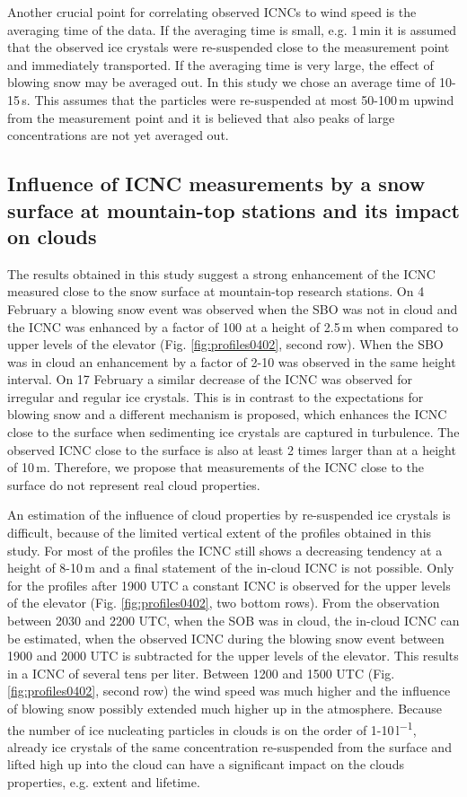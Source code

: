 \documentclass[draft,linenumbers]{agujournal}
\begin{document}
Another crucial point for correlating observed ICNCs to wind speed is the averaging time of the data. If the averaging time is small, e.g. 1\,\si{min} it is assumed that the observed ice crystals were re-suspended close to the measurement point and immediately transported. If the averaging time is very large, the effect of blowing snow may be averaged out. In this study we chose an average time of 10-15\,\si{s}. This assumes that the particles were re-suspended at most 50-100\,\si{m} upwind from the measurement point and it is believed that also peaks of large concentrations are not yet averaged out. 


\subsection{Influence of ICNC measurements by a snow surface at mountain-top stations and its impact on clouds}

The results obtained in this study suggest a strong enhancement of the ICNC measured close to the snow surface at mountain-top research stations. On 4 February a blowing snow event was observed when the SBO was not in cloud and the ICNC was enhanced by a factor of 100 at a height of 2.5\,\si{m} when compared to upper levels of the elevator (Fig. \ref{fig:profiles0402}, second row). When the SBO was in cloud an enhancement by a factor of 2-10 was observed in the same height interval. On 17 February a similar decrease of the ICNC was observed for irregular and regular ice crystals. This is in contrast to the expectations for blowing snow and a different mechanism is proposed, which enhances the ICNC close to the surface when sedimenting ice crystals are captured in turbulence. The observed ICNC close to the surface is also at least 2 times larger than at a height of 10\,\si{m}. Therefore, we propose that measurements of the ICNC close to the surface do not represent real cloud properties. 

An estimation of the influence of cloud properties by re-suspended ice crystals is difficult, because of the limited vertical extent of the profiles obtained in this study. For most of the profiles the ICNC still shows a decreasing tendency at a height of 8-10\,\si{m} and a final statement of the in-cloud ICNC is not possible. Only for the profiles after 1900 UTC a constant ICNC is observed for the upper levels of the elevator (Fig. \ref{fig:profiles0402}, two bottom rows). From the observation between  2030 and 2200 UTC, when the SOB was in cloud, the in-cloud ICNC can be estimated, when the observed ICNC during the blowing snow event between 1900 and 2000 UTC is subtracted for the upper levels of the elevator. This results in a ICNC of several tens per liter. Between 1200 and 1500 UTC (Fig. \ref{fig:profiles0402}, second row) the wind speed was much higher and the influence of blowing snow possibly extended much higher up in the atmosphere. Because the number of ice nucleating particles in clouds is on the order of 1-10\,\si{l^{-1}}, already ice crystals of the same concentration re-suspended from the surface and lifted high up into the cloud can have a significant impact on the clouds properties, e.g. extent and lifetime. 
\end{document}
